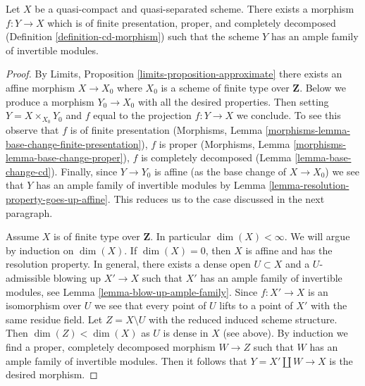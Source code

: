 \begin{proposition}
\label{proposition-envelope-with-resolution-property}
Let $X$ be a quasi-compact and quasi-separated scheme. There exists a
morphism $f : Y \to X$ which is of finite presentation, proper, and
completely decomposed (Definition \ref{definition-cd-morphism})
such that the scheme $Y$ has an ample family of invertible modules.
\end{proposition}

\begin{proof}
By Limits, Proposition \ref{limits-proposition-approximate}
there exists an affine morphism $X \to X_0$ where $X_0$
is a scheme of finite type over $\mathbf{Z}$. Below we produce
a morphism $Y_0 \to X_0$ with all the desired properties.
Then setting $Y = X \times_{X_0} Y_0$ and $f$ equal to
the projection $f : Y \to X$ we conclude.
To see this observe that $f$ is of finite presentation
(Morphisms, Lemma \ref{morphisms-lemma-base-change-finite-presentation}),
$f$ is proper
(Morphisms, Lemma \ref{morphisms-lemma-base-change-proper}),
$f$ is completely decomposed
(Lemma \ref{lemma-base-change-cd}). Finally, since $Y \to Y_0$ is
affine (as the base change of $X \to X_0$) we see that $Y$ has
an ample family of invertible modules by
Lemma \ref{lemma-resolution-property-goes-up-affine}.
This reduces us to the case discussed in the next paragraph.

\medskip\noindent
Assume $X$ is of finite type over $\mathbf{Z}$. In particular
$\dim(X) < \infty$. We will argue by induction on $\dim(X)$.
If $\dim(X) = 0$, then $X$ is affine and has the resolution property.
In general, there exists a dense open $U \subset X$ and a
$U$-admissible blowing up $X' \to X$ such that $X'$ has
an ample family of invertible modules, see
Lemma \ref{lemma-blow-up-ample-family}.
Since $f : X' \to X$ is an isomorphism over $U$
we see that every point of $U$ lifts to a point of $X'$
with the same residue field.
Let $Z = X \setminus U$ with the reduced induced scheme structure.
Then $\dim(Z) < \dim(X)$ as $U$ is dense in $X$ (see above).
By induction we find a proper, completely decomposed
morphism $W \to Z$ such that $W$ has an ample family of invertible
modules. Then it follows that $Y = X' \amalg W \to X$ is the desired
morphism.
\end{proof}